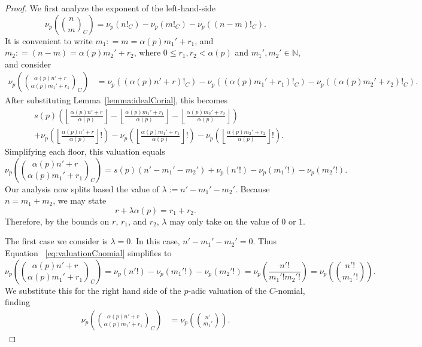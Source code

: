 \documentclass{amsart}
\theoremstyle{definition}
\newcommand{\N}{\mathbb{N}}
\newcommand{\colonequal}{\mathrel{\mathop:}=}
\begin{document}
\begin{proof}
We first analyze the exponent of the left-hand-side $$\nu_p\!\left(\binom{n}{m}_C\right) = \nu_p(n!_C)-\nu_p(m!_C)-\nu_p\!\left((n-m)!_C\right).$$ 
It is convenient to write $ m_1 \colonequal m=\alpha(p) m_1' + r_1 $, and $m_2\colonequal(n-m)=\alpha(p)m_2'+r_2$, where $ 0 \leq r_1,r_2 < \alpha(p) $ and $ m_1',m_2' \in \N $, and consider
\begin{align*}
\nu_p\!\left(\binom{\alpha(p)n'+r}{\alpha(p)m_1'+r_1}_C\right) &= \nu_p\!\left((\alpha(p)n' + r)!_C\right)-\nu_p\!\left((\alpha(p)m_1' + r_1)!_C\right)-\nu_p\!\left((\alpha(p)m_2' + r_2)!_C\right).
\end{align*}
After substituting Lemma~\ref{lemma:idealCorial}, this becomes
\begin{align*}
    & s(p)\left(\left\lfloor\frac{\alpha(p)n'+r}{\alpha(p)}\right\rfloor-\left\lfloor\frac{\alpha(p)m_1'+r_1}{\alpha(p)}\right\rfloor-\left\lfloor\frac{\alpha(p)m_2' + r_2}{\alpha(p)}\right\rfloor\right) \\ & +\nu_p\left(\left\lfloor\frac{\alpha(p)n'+r}{\alpha(p)}\right\rfloor!\right) - \nu_p\left(\left\lfloor\frac{\alpha(p)m_1'+r_1}{\alpha(p)}\right\rfloor!\right) - \nu_p\left(\left\lfloor\frac{\alpha(p)m_2'+r_2}{\alpha(p)}\right\rfloor!\right).
\end{align*}
Simplifying each floor, this valuation equals
\begin{equation} \label{eq:valuationCnomial}
\nu_p\!\left(\binom{\alpha(p)n'+r}{\alpha(p)m_1'+r_1}_C\right)= s(p)\left(n'-m_1'-m_2'\right) + \nu_p\left(n'!\right) - \nu_p\left(m_1'!\right) - \nu_p\left(m_2'!\right).
\end{equation}
Our analysis now splits based the value of $\lambda:= n'-m_1'-m_2'$. 
Because $n=m_1+m_2$, we may state
$$r+\lambda\alpha(p)=r_1+r_2.$$
Therefore, by the bounds on $r$, $r_1$, and $r_2$, $\lambda$ may only take on the value of $0$ or $1$. 

The first case we consider is $\lambda=0$. In this case, $n'-m_1'-m_2'=0$. Thus Equation ~\eqref{eq:valuationCnomial} simplifies to
\begin{equation*} 
\nu_p\!\left(\binom{\alpha(p)n'+r}{\alpha(p)m_1'+r_1}_C\right)=
\nu_p\left(n'!\right) - \nu_p\left(m_1'!\right) - \nu_p\left(m_2'!\right) = \nu_p\left(\frac{n'!}{m_1'!m_2'!}\right) = \nu_p\!\left(\binom{n'!}{m_1'!}\right).
\end{equation*}
We substitute this for the right hand side of the $p$-adic valuation of the $C$-nomial, finding \begin{align*}
    \nu_p\!\left(\binom{\alpha(p)n'+r}{\alpha(p)m_1'+r_1}_C\right) &= \nu_p\!\left(\binom{n'}{m_1'}\right).
\end{align*}


\end{proof}
\end{document}
